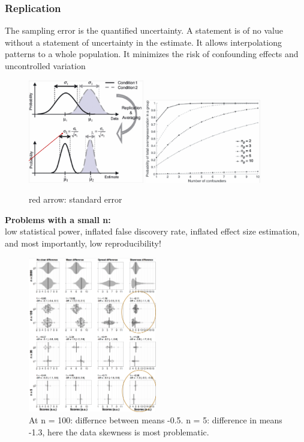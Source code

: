 \documentclass{article}
\begin{document}
\subsubsection{Replication}
The sampling error is the quantified uncertainty. A statement is of no value without a statement of uncertainty in the estimate. It allows interpolationg patterns to a whole population. It minimizes the risk of confounding effects and uncontrolled variation
\begin{figure}[H]
\centering
\includegraphics[width = 0.45\textwidth]{exp-design/replication.png}
\includegraphics[width = 0.45\textwidth]{exp-design/replication2.png}
\caption{red arrow: standard error}
\end{figure}

\textbf{Problems with a small n:} \\
low statistical power, inflated false discovery rate, inflated effect size estimation, and most importantly, low reproducibility!

\begin{figure}[H]
\centering
\includegraphics[width = 0.5\textwidth]{exp-design/small-n.png}
\caption{At n = 100: differnce between means -0.5. n = 5: difference in means -1.3, here the data skewness is most problematic.}
\end{figure}
\end{document}
